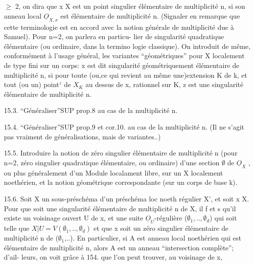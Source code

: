 
$\geqslant$ 2, on dira que x \hand{$\in$} X est un point singulier élémentaire de multiplicité
n, si son anneau local $\underline{O}_{X,x}$ est élémentaire de multiplicité n. (Signaler
en remarque que cette  terminologie est en accord avec la notion
générale de multiplicité due à Samuel). Pour n=2, on parlera en particu-%
lier de singularité quadratique élémentaire (ou ordinaire, dans la termino
logie classique). On introduit de même, conformément à l'usage général,
les variantes ``géométriques'' pour X localement de type fini sur un corps:
x  est dit singularité géométriquement élémentaire de multiplicité n, si
pour toute (ou,ce qui revient au même\unsure{,} une)extension K de k, et tout
(ou un) point$^{z}$ de $X_{K}$ au dessus de x, rationnel sur K, z est une
singularité élémentaire de multiplicité n.

15.3. ``Généraliser''SUP prop.8 au cas de la multiplicité n.

15.4. ``Généraliser''SUP prop.9 et cor.10. au cas de la multiplicité n.
(Il ne s'agit pas vraiment de généralisations, mais de variantes..)

15.5. Introduire la notion de zéro singulier élémentaire de multiplicité
n (pour n=2, zéro singulier quadratique élémentaire, ou ordinaire) d'une
section $\emptyset$ de $\underline{O}_{X}$ , ou plus généralement d'un Module localament libre, sur
un X localement noethérien, et la notion géométrique correspondante
(sur un corps de base k).

15.6. Soit X un sous-préschéma d'un préschéma loc noeth régulier X', et
soit x \hand{$\in$}X. Pour que  soit une singularité élémentaire de multiplicité
n de X, il f et s qu'il existe un voisinage ouvert U de x, et une
suite $\underline{O}_{U}$-régulière ($\emptyset_{1},..,\emptyset_{d}$) qui soit telle que $X|U = V(\emptyset_{1},..,\emptyset_{d})$ et
que x soit un zéro singulier élémentaire de multiplicité n de ($\emptyset_{1}$,..).
En particulier, si A est anneau local noethérien qui est élémentaire
\margin{$|$} de multiplicité n, alors A est un anneau ``intersection complète''; d'ail-%
leurs, on voit grâce à 154. que l'on peut trouver, au voisinage de x,

